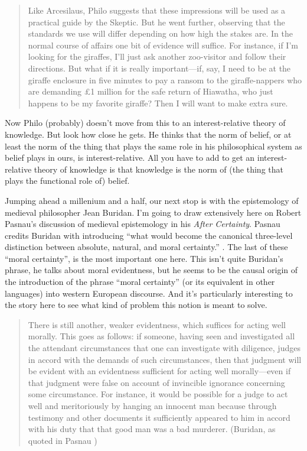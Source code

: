 \documentclass[
  11pt,
]{book}
\begin{document}
\begin{quote}
Like Arcesilaus, Philo suggests that these impressions will be used as a practical guide by the Skeptic. But he went further, observing that the standards we use will differ depending on how high the stakes are. In the normal course of affairs one bit of evidence will suffice. For instance, if I'm looking for the giraffes, I'll just ask another zoo-visitor and follow their directions. But what if it is really important---if, say, I need to be at the giraffe enclosure in five minutes to pay a ransom to the giraffe-nappers who are demanding £1 million for the safe return of Hiawatha, who just happens to be my favorite giraffe? Then I will want to make extra sure. \citep[112]{Adamson2015}
\end{quote}

Now Philo (probably) doesn't move from this to an interest-relative theory of knowledge. But look how close he gets. He thinks that the norm of belief, or at least the norm of the thing that plays the same role in his philosophical system as belief plays in ours, is interest-relative. All you have to add to get an interest-relative theory of knowledge is that knowledge is the norm of (the thing that plays the functional role of) belief.

Jumping ahead a millenium and a half, our next stop is with the epistemology of medieval philosopher Jean Buridan. I'm going to draw extensively here on Robert Pasnau's discussion of medieval epistemology in his \emph{After Certainty}. Pasnau credits Buridan with introducing ``what would become the canonical three-level distinction between absolute, natural, and moral certainty.'' \citep[32]{Pasnau2017}. The last of these ``moral certainty'', is the most important one here. This isn't quite Buridan's phrase, he talks about moral evidentness, but he seems to be the causal origin of the introduction of the phrase ``moral certainty'' (or its equivalent in other languages) into western European discourse. And it's particularly interesting to the story here to see what kind of problem this notion is meant to solve.

\begin{quote}
There is still another, weaker evidentness, which suffices for acting well morally. This goes as follows: if someone, having seen and investigated all the attendant circumstances that one can investigate with diligence, judges in accord with the demands of such circumstances, then that judgment will be evident with an evidentness sufficient for acting well morally---even if that judgment were false on account of invincible ignorance concerning some circumstance. For instance, it would be possible for a judge to act well and meritoriously by hanging an innocent man because through testimony and other documents it sufficiently appeared to him in accord with his duty that that good man was a bad murderer. (Buridan, as quoted in Pasnau \citeyearpar[34]{Pasnau2017})
\end{quote}
\end{document}
